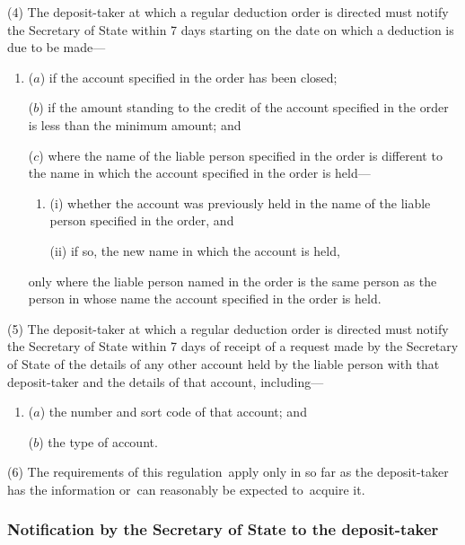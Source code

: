 \documentclass[12pt,a4paper]{article}
\begin{document}
(4) The deposit-taker at which a regular deduction order is directed must notify the 
Secretary of State  %
within 7 days starting on the date on which a deduction is due to be made—
\begin{enumerate}\item[]
($a$) if the account specified in the order has been closed;

($b$) if the amount standing to the credit of the account specified in the order is less than the minimum amount; and

($c$) where the name of the liable person specified in the order is different to the name in which the account specified in the order is held—
\begin{enumerate}\item[]
(i) whether the account was previously held in the name of the liable person specified in the order, and

(ii) if so, the new name in which the account is held,
\end{enumerate}
only where the liable person named in the order is the same person as the person in whose name the account specified in the order is held.
\end{enumerate}

(5) The deposit-taker at which a regular deduction order is directed must notify the 
Secretary of State  %
within 7 days of receipt of a request made by the 
Secretary of State  %
of the details of any other account held by the liable person with that deposit-taker and the details of that account, including—
\begin{enumerate}\item[]
($a$) the number and sort code of that account; and

($b$) the type of account.
\end{enumerate}

(6) The requirements of this regulation~apply only in so far as the deposit-taker has the information or~can reasonably be expected to~acquire it.


\subsubsection[25F. Notification by the 
Secretary of State  %
to the deposit-taker]{Notification by the 
Secretary of State  %
to the deposit-taker}
\end{document}
